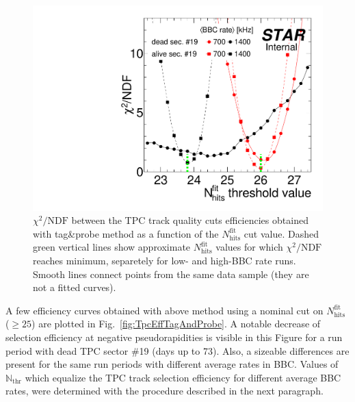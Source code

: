\begin{figure}[H]
\begin{minipage}{.4725\textwidth}
\end{minipage}%
\quad\quad%
\begin{minipage}{.4725\textwidth}%
  \centering%
  \includegraphics[width=\linewidth,page=1]{graphics/systematicsEfficiency/bbc_and/Chi2VsNHitsFitCut.pdf}\vspace{-5pt}%
  \caption[$\chi^{2}/\text{NDF}$ obtained in the search for the best $N_{\text{hits}}^{\text{fit}}$ cut value.]
   {$\chi^{2}/\text{NDF}$ between the TPC track quality cuts efficiencies obtained with tag\&probe method as a function of the $N_{\text{hits}}^{\text{fit}}$ cut value. Dashed green vertical lines show approximate $N_{\text{hits}}^{\text{fit}}$ values for which $\chi^{2}/\text{NDF}$ reaches minimum, separetely for low- and high-BBC rate runs. Smooth lines connect points from the same data sample (they are not a fitted curves).}\label{fig:Chi2VsNHitsFitCut}%
\end{minipage}%
\end{figure}%

A few efficiency curves obtained with above method using a nominal cut on $N_{\text{hits}}^{\text{fit}}$ ($\geq25$) are plotted in Fig.~\ref{fig:TpcEffTagAndProbe}. A notable decrease of selection efficiency at negative pseudorapidities is visible in this Figure for a run period with dead TPC sector \#19 (days up to 73). Also, a sizeable differences are present for the same run periods with different average rates in BBC. Values of $\mathbb{N}_{\text{thr}}$ which equalize the TPC track selection efficiency for different  average BBC rates, were determined with the procedure described in the next paragraph.

